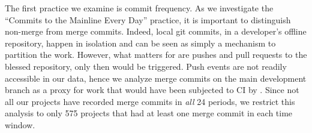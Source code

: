 

The first practice we examine is commit frequency.
As we investigate the ``Commits to the Mainline Every Day'' practice, it is
important to distinguish non-merge from merge commits.
Indeed, local git commits, in a developer's offline repository, happen in 
isolation and can be seen as simply a mechanism to partition the work.
However, what matters for \Tvis are pushes and pull requests to the blessed 
\GH repository, \ie only then \Tvi would be triggered.
Push events are not readily accessible in our data, hence we analyze 
merge commits on the main development branch as a proxy for work
that would have been subjected to CI by \Tvi.
Since not all our projects have recorded merge commits in \emph{all} 24 
periods, we restrict this analysis to only 575 projects that had at least one 
merge commit in each time window.


